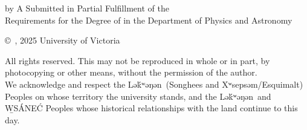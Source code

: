 \pagebreak
{
	\centering
	\thesistitle
	\tpbreak
	by
	\tpbreak
	\nameanddegrees
	\tpbreak
	A \PhDorMas Submitted in Partial Fulfillment of the \\
	Requirements for the Degree of
	\tpbreak
	\PhDorMaster
	\tpbreak
	in the Department of Physics and Astronomy\\
	\vfill
	\begin{center}
		\copyright\ \yourname, 2025 \linebreak
		\phantom{\copyright} University of Victoria
	\end{center}

	All rights reserved. This \PhDorMas may not be reproduced in whole or in part, by photocopying or other means, without the permission of the author.\hfill\\
	\vspace{1em}
	We acknowledge and respect the Lə\'{k}ʷəŋən\ (Songhees and Xʷsepsəm/Esquimalt) Peoples on whose territory the university stands, and the Lə\'{k}ʷəŋən\ and \b{W}SÁNE\'C Peoples whose historical relationships with the land continue to this day. 
}
\pagebreak
